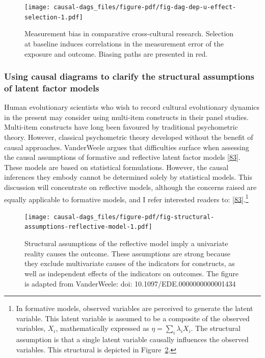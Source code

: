 \documentclass[
  singlecolumn]{article}
\begin{document}
\begin{figure}

{\centering \texttt{[image: causal-dags\_files/figure-pdf/fig-dag-dep-u-effect-selection-1.pdf]}

}

\caption{\label{fig-dag-dep-u-effect-selection}Measurement bias in
comparative cross-cultural research. Selection at baseline induces
correlations in the measurement error of the exposure and outcome.
Biasing paths are presented in red.}

\end{figure}

\hypertarget{using-causal-diagrams-to-clarify-the-structural-assumptions-of-latent-factor-models}{%
\subsubsection{Using causal diagrams to clarify the structural
assumptions of latent factor
models}\label{using-causal-diagrams-to-clarify-the-structural-assumptions-of-latent-factor-models}}

Human evolutionary scientists who wish to record cultural evolutionary
dynamics in the present may consider using multi-item constructs in
their panel studies. Multi-item constructs have long been favoured by
traditional psychometric theory. However, classical psychometric theory
developed without the benefit of causal approaches. VanderWeele argues
that difficulties surface when assessing the causal assumptions of
formative and reflective latent factor models
{[}\protect\hyperlink{ref-vanderweele2022}{83}{]}. These models are
based on statistical formulations. However, the causal inferences they
embody cannot be determined solely by statistical models. This
discussion will concentrate on reflective models, although the concerns
raised are equally applicable to formative models, and I refer
interested readers to:
{[}\protect\hyperlink{ref-vanderweele2022}{83}{]}.\footnote{In formative
  models, observed variables are perceived to generate the latent
  variable. This latent variable is assumed to be a composite of the
  observed variables, \(X_i\), mathematically expressed as
  \(\eta = \sum_i\lambda_i X_i\). The structural assumption is that a
  single latent variable causally influences the observed variables.
  This structural is depicted in
  Figure~\ref{fig-structural-assumptions-reflective-model}.}

\begin{figure}

{\centering \texttt{[image: causal-dags\_files/figure-pdf/fig-structural-assumptions-reflective-model-1.pdf]}

}

\caption{\label{fig-structural-assumptions-reflective-model}Structural
assumptions of the reflective model imply a univariate reality causes
the outcome. These assumptions are strong because they exclude
multivariate causes of the indicators for constructs, as well as
independent effects of the indicators on outcomes. The figure is adapted
from VanderWeele: doi: 10.1097/EDE.0000000000001434}

\end{figure}
\end{document}
